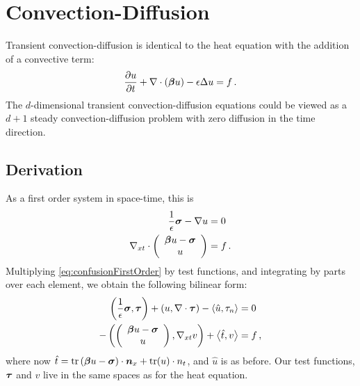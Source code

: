 \documentclass[Dissertation.tex]{subfiles}
\begin{document}
\section{Convection-Diffusion}
Transient convection-diffusion is identical to the heat equation with the addition of a convective term:
\begin{equation*}
\frac{\partial u}{\partial t}+\nabla\cdot(\boldsymbol\beta u)-\epsilon\Delta u=f\,.
\end{equation*}
The $d$-dimensional transient convection-diffusion equations could be viewed as a $d+1$ steady convection-diffusion problem with zero diffusion in the time direction.

\subsection{Derivation}
As a first order system in space-time, this is
\begin{equation}
\label{eq:confusionFirstOrder}
\begin{aligned}
\frac{1}{\epsilon}\boldsymbol\sigma-\nabla u&=0\\
\nabla_{xt}\cdot\left( \begin{array}{c} \boldsymbol\beta u-\boldsymbol\sigma\\ u\\ \end{array} \right)&=f\,.
\end{aligned}
\end{equation}
Multiplying \eqref{eq:confusionFirstOrder} by test functions, and integrating by parts over each element, we obtain the following bilinear form:
\begin{equation}
\label{eq:confusionBF}
	\begin{aligned}
		\left( \frac{1}{\epsilon}\boldsymbol\sigma,\boldsymbol\tau \right)+\left( u,\nabla\cdot\boldsymbol\tau \right)-\left\langle \hat u,\tau_n \right\rangle&=0\\
		-\left( \left( \begin{array}{c} \boldsymbol\beta u-\boldsymbol\sigma\\ u\\ \end{array} \right),\nabla_{xt} v \right)+\left\langle \hat t,v \right\rangle&=f\,,
	\end{aligned}
\end{equation}
where now $\hat t=\operatorname*{tr}\left( \boldsymbol\beta u-\boldsymbol\sigma \right)\cdot\boldsymbol n_x+\operatorname*{tr}(u)\cdot n_t$, and $\hat u$ is as before. Our test functions, $\boldsymbol\tau$ and $v$ live in the same spaces as for the heat equation.
\end{document}
